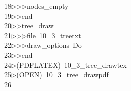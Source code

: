 \begin{tabbing}
18\>$\triangleright$\>$\triangleright$\>$\triangleright$\>nodes\_empty\ \\[0pt]
19\>$\triangleright$\>$\triangleright$\>end\ \\[0pt]
20\>$\triangleright$\>$\triangleright$\>tree\_draw\ \\[0pt]
21\>$\triangleright$\>$\triangleright$\>$\triangleright$\>file\ 10\_3\_treetxt\ \\[0pt]
22\>$\triangleright$\>$\triangleright$\>$\triangleright$\>draw\_options\ Do\ \\[0pt]
23\>$\triangleright$\>$\triangleright$\>end\\[0pt]
24\>$\triangleright$\>(PDFLATEX)\ 10\_3\_tree\_drawtex\\[0pt]
25\>$\triangleright$\>(OPEN)\ 10\_3\_tree\_drawpdf\\[0pt]
26\>\end{tabbing}
